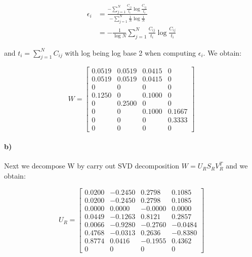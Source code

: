 \documentclass[a4paper]{article}
\begin{document}
\begin{align}
	\epsilon_i &= \frac{-\sum_{j=1}^N \frac{C_{ij}}{t_i} \log \frac{C_{ij}}{t_i}}{-\sum_{j=1}^N \frac{1}{N} \log \frac{1}{N}} \\
		&= -\frac{1}{\log N} \sum_{j=1}^N \frac{C_{ij}}{t_i} \log \frac{C_{ij}}{t_i}
\end{align}

and $t_i = \sum_{j=1}^N C_{ij}$ with log being log base 2 when computing $\epsilon_i$. We obtain:

\begin{equation}
	W = \begin{bmatrix}
            0.0519  &  0.0519  &  0.0415   &      0 \\
		    0.0519  &  0.0519  &  0.0415   &      0 \\
	        0       &  0       &  0        & 0 \\
			0.1250  &       0  &  0.1000   &      0 \\
			0   & 0.2500   &     0         & 0 \\
			0   &      0   & 0.1000  &  0.1667 \\
			0   &      0   &     0   & 0.3333 \\
			0   &      0   &     0   &      0
        \end{bmatrix}
\end{equation}

\paragraph{b)} Next we decompose W by carry out SVD decomposition $W = U_RS_RV_R^T$ and we obtain:

\begin{equation}
	U_R = \begin{bmatrix}
			0.0200 &  -0.2450  &  0.2798 &   0.1085 \\
			0.0200 &  -0.2450  &  0.2798 &   0.1085 \\
			0.0000 &   0.0000  & -0.0000 &   0.0000 \\
			0.0449 &  -0.1263  &  0.8121 &   0.2857 \\
			0.0066 &  -0.9280  & -0.2760 &  -0.0484 \\
			0.4768 &  -0.0313  &  0.2636 &  -0.8380 \\
			0.8774 &   0.0416  & -0.1955 &   0.4362 \\
			0      &   0       &  0      &   0
		\end{bmatrix}
\end{equation}
\end{document}
